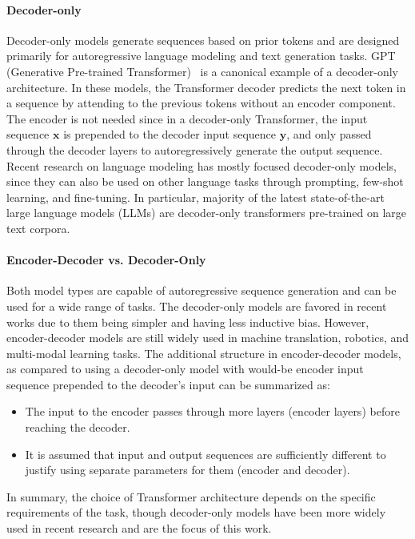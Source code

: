 \paragraph{Decoder-only}
Decoder-only models generate sequences based on prior tokens and are designed primarily for autoregressive language modeling and text generation tasks. GPT (Generative Pre-trained Transformer)~\cite{radford_improving_2018} is a canonical example of a decoder-only architecture. In these models, the Transformer decoder predicts the next token in a sequence by attending to the previous tokens without an encoder component. The encoder is not needed since in a decoder-only Transformer, the input sequence $\mathbf{x}$ is prepended to the decoder input sequence $\mathbf{y}$, and only passed through the decoder layers to autoregressively generate the output sequence. Recent research on language modeling has mostly focused decoder-only models, since they can also be used on other language tasks through prompting, few-shot learning, and fine-tuning. In particular, majority of the latest state-of-the-art large language models (LLMs) are decoder-only transformers pre-trained on large text corpora.

\bigskip

\paragraph{Encoder-Decoder vs. Decoder-Only} Both model types are capable of autoregressive sequence generation and can be used for a wide range of tasks. The decoder-only models are favored in recent works due to them being simpler and having less inductive bias. However, encoder-decoder models are still widely used in machine translation, robotics, and multi-modal learning tasks. The additional structure in encoder-decoder models, as compared to using a decoder-only model with would-be encoder input sequence prepended to the decoder's input can be summarized as:
\begin{itemize}
    \item The input to the encoder passes through more layers (encoder layers) before reaching the decoder.
    \item It is assumed that input and output sequences are sufficiently different to justify using separate parameters for them (encoder and decoder).
\end{itemize}

In summary, the choice of Transformer architecture depends on the specific requirements of the task, though decoder-only models have been more widely used in recent research and are the focus of this work.

